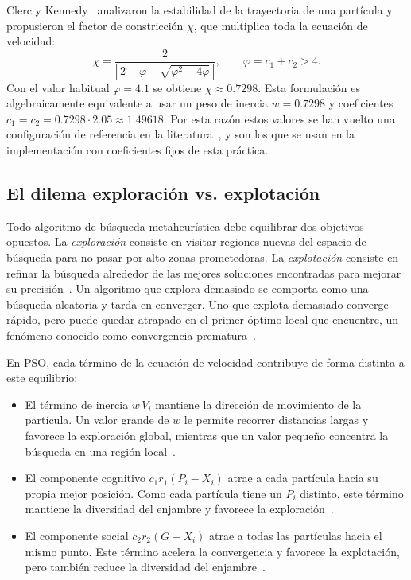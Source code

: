 Clerc y Kennedy~\cite{clerc2002particle} analizaron la estabilidad de la trayectoria de una partícula y propusieron el factor de constricción $\chi$, que multiplica toda la ecuación de velocidad:
\begin{equation}
    \chi = \frac{2}{\left|\, 2 - \varphi - \sqrt{\varphi^2 - 4\varphi} \,\right|}, \qquad \varphi = c_1 + c_2 > 4.
    \label{eq:constriccion}
\end{equation}
Con el valor habitual $\varphi = 4.1$ se obtiene $\chi \approx 0.7298$. Esta formulación es algebraicamente equivalente a usar un peso de inercia $w = 0.7298$ y coeficientes $c_1 = c_2 = 0.7298 \cdot 2.05 \approx 1.49618$. Por esta razón estos valores se han vuelto una configuración de referencia en la literatura~\cite{eberhart2000comparing, poli2007overview}, y son los que se usan en la implementación con coeficientes fijos de esta práctica.


\subsection{El dilema exploración vs. explotación}
\label{sec:exploracion}

Todo algoritmo de búsqueda metaheurística debe equilibrar dos objetivos opuestos. La \textit{exploración} consiste en visitar regiones nuevas del espacio de búsqueda para no pasar por alto zonas prometedoras. La \textit{explotación} consiste en refinar la búsqueda alrededor de las mejores soluciones encontradas para mejorar su precisión~\cite{crepinsek2013exploration}. Un algoritmo que explora demasiado se comporta como una búsqueda aleatoria y tarda en converger. Uno que explota demasiado converge rápido, pero puede quedar atrapado en el primer óptimo local que encuentre, un fenómeno conocido como convergencia prematura~\cite{crepinsek2013exploration, zhan2009adaptive}.

En PSO, cada término de la ecuación de velocidad contribuye de forma distinta a este equilibrio:
\begin{itemize}
    \item El término de inercia $w\,V_i$ mantiene la dirección de movimiento de la partícula. Un valor grande de $w$ le permite recorrer distancias largas y favorece la exploración global, mientras que un valor pequeño concentra la búsqueda en una región local~\cite{shi1998modified, shi1998parameter}.
    \item El componente cognitivo $c_1 r_1 (P_i - X_i)$ atrae a cada partícula hacia su propia mejor posición. Como cada partícula tiene un $P_i$ distinto, este término mantiene la diversidad del enjambre y favorece la exploración~\cite{ratnaweera2004self}.
    \item El componente social $c_2 r_2 (G - X_i)$ atrae a todas las partículas hacia el mismo punto. Este término acelera la convergencia y favorece la explotación, pero también reduce la diversidad del enjambre~\cite{ratnaweera2004self}.
\end{itemize}

